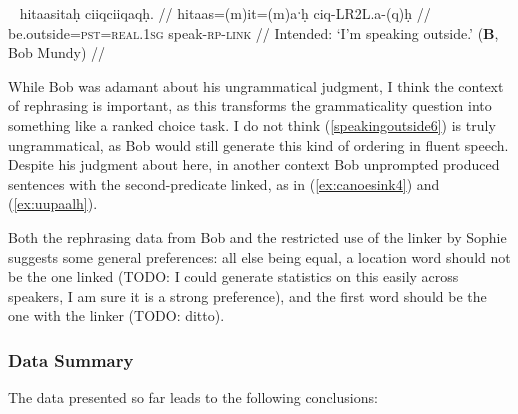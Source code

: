 \ex~ \label{speakingoutside6}
\begingl
\glpreamble *hitaasitaḥ ciiqciiqaqḥ. //
\gla hitaas=(m)it=(m)aˑḥ ciq-LR2L.a-(q)ḥ //
\glb be.outside=\textsc{pst}=\textsc{real.1sg} speak-\textsc{rp}-\textsc{link} //
\glft Intended: `I'm speaking outside.' (\textbf{B}, Bob Mundy) //
\endgl
\xe

While Bob was adamant about his ungrammatical judgment, I think the context of rephrasing is important, as this transforms the grammaticality question into something like a ranked choice task. I do not think (\ref{speakingoutside6}) is truly ungrammatical, as Bob would still generate this kind of ordering in fluent speech. Despite his judgment about here, in another context Bob unprompted produced sentences with the second-predicate linked, as in (\ref{ex:canoesink4}) and (\ref{ex:uupaalh}).

Both the rephrasing data from Bob and the restricted use of the linker by Sophie suggests some general preferences: all else being equal, a location word should not be the one linked (TODO: I could generate statistics on this easily across speakers, I am sure it is a strong preference), and the first word should be the one with the linker (TODO: ditto).

\subsubsection{Data Summary}

The data presented so far leads to the following conclusions:

